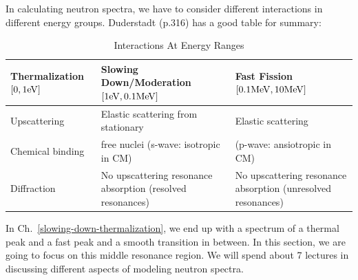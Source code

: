 \documentclass{school-22.211-notes}
\date{February 15, 2012}
\begin{document}
\maketitle



 \label{resonance-model-chap}
In calculating neutron spectra, we have to consider different interactions in different energy groups. Duderstadt (p.316) has a good table for summary: 
\begin{table}[ht]
  \centering
  \begin{tabular}{|p{1.3in}|p{2.3in}|p{2in}|} \hline
    Thermalization $[0,1\mathrm{eV}]$  & Slowing Down/Moderation $[1\mathrm{eV}, 0.1\mathrm{MeV}]$ & Fast Fission $[0.1\mathrm{MeV}, 10\mathrm{MeV}]$ \\ \hline
    Upscattering   & Elastic scattering from stationary  &  Elastic scattering  \\
    Chemical binding &free nuclei (s-wave: isotropic in CM) & (p-wave: ansiotropic in CM)\\
    Diffraction & No upscattering resonance absorption (resolved resonances) & No upscattering resonance absorption (unresolved resonances) \\ \hline
  \end{tabular}
  \caption{Interactions At Energy Ranges}
\end{table}

In Ch.~\ref{slowing-down-thermalization}, we end up with a spectrum of a thermal peak and a fast peak and a smooth transition in between. In this section, we are going to focus on this middle resonance region. We will spend about 7 lectures in discussing different aspects of modeling neutron spectra. 
\end{document}
